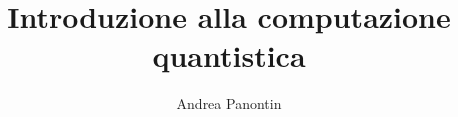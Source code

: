 \documentclass[a4paper,10pt]{report}
\title{Introduzione alla computazione quantistica}
\author{Andrea Panontin}
\theoremstyle{algoritmo}
\theoremstyle{definizione}
\theoremstyle{definizione}
\numberwithin{equation}{chapter}
\begin{document}


\tableofcontents

\newpage








\begin{appendices}
 
 
\end{appendices}

\nocite{*}
\printbibliography
\end{document}
